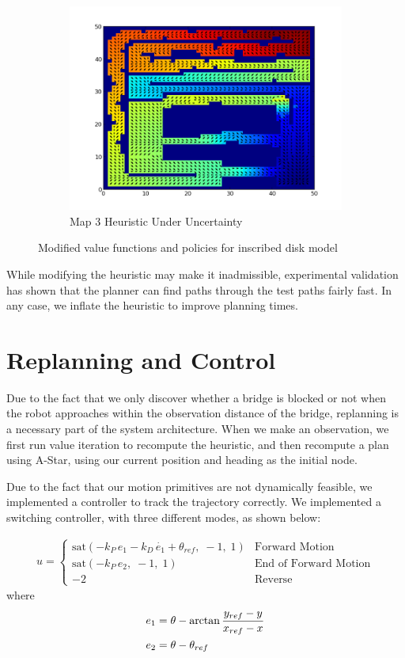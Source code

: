 \documentclass{article}
\begin{document}
\begin{figure}[ht]
\begin{subfigure}[b]{0.45\textwidth}
        \includegraphics[width = \textwidth]{map3value_uncertain.png}
        \caption{Map 3 Heuristic Under Uncertainty}
        \label{fig:map3value_mod}
    \end{subfigure}
    \caption{Modified value functions and policies for inscribed disk model}
    \label{fig:valuefcns_mod}
\end{figure}

While modifying the heuristic may make it inadmissible, experimental validation has shown that the planner can find paths through the test paths fairly fast. In any case, we inflate the heuristic to improve planning times.

\section{Replanning and Control}

Due to the fact that we only discover whether a bridge is blocked or not when the robot approaches within the observation distance of the bridge, replanning is a necessary part of the system architecture. When we make an observation, we first run value iteration to recompute the heuristic, and then recompute a plan using A-Star, using our current position and heading as the initial node.

Due to the fact that our motion primitives are not dynamically feasible, we implemented a controller to track the trajectory correctly. We implemented a switching controller, with three different modes, as shown below:

\begin{align*}
u =
\begin{cases}
\mathrm{sat}(-k_P\,e_1 - k_D\,\dot{e_1} + \theta_{ref},\; -1,\; 1) & \text{Forward Motion}\\
\mathrm{sat}(-k_P\,e_2,\; -1,\; 1) & \text{End of Forward Motion}\\
-2 & \text{Reverse}
\end{cases}
\end{align*}
where 
\begin{align*}
\centering
e_1 &= \theta - \arctan{\frac{y_{ref} - y}{x_{ref} - x}}\\
e_2 &= \theta - \theta_{ref}
\end{align*}
\end{document}
